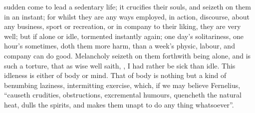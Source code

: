 sudden come to lead a sedentary life; it crucifies their souls, and seizeth on
them in an instant; for whilst they are any ways employed, in action,
discourse, about any business, sport or recreation, or in company to their
liking, they are very well; but if alone or idle, tormented instantly again;
one day's solitariness, one hour's sometimes, doth them more harm, than a
week's physic, labour, and company can do good. Melancholy seizeth on them
forthwith being alone, and is such a torture, that as wise \Seneca{} well saith,
, I had rather be sick than idle. This
idleness is either of body or mind. That of body is nothing but a kind of
benumbing laziness, intermitting exercise, which, if we may believe
Fernelius, \enquote{causeth crudities, obstructions, excremental
humours, quencheth the natural heat, dulls the spirits, and makes them unapt to
do any thing whatsoever}.


